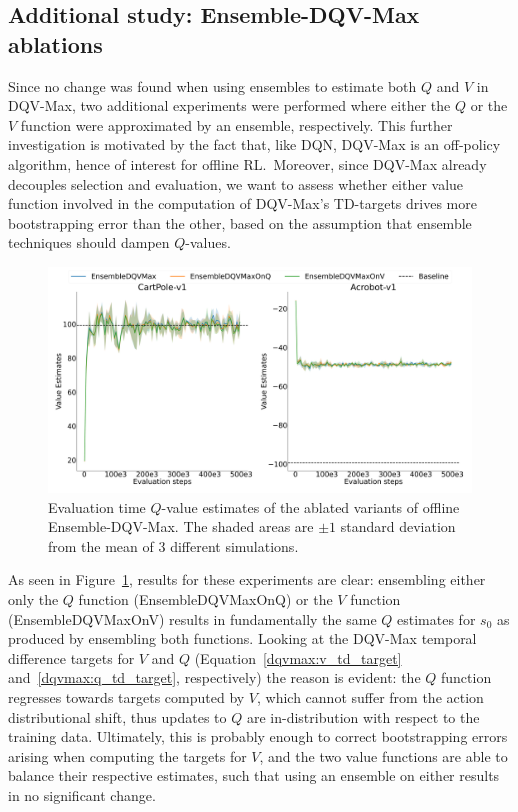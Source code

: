 \subsection{Additional study: Ensemble-DQV-Max ablations}
Since no change was found when using ensembles to estimate both $Q$
and $V$ in DQV-Max, two additional experiments were performed where
either the $Q$ or the $V$ function were approximated by an ensemble,
respectively. This further investigation is motivated by the fact
that, like DQN, DQV-Max is an off-policy algorithm, hence of interest
for offline RL.\ Moreover, since DQV-Max already decouples selection
and evaluation, we want to assess whether either value function
involved in the computation of DQV-Max's TD-targets drives more
bootstrapping error than the other, based on the assumption that
ensemble techniques should dampen $Q$-values.
\begin{figure}[!tbp]
  \centering
  \includegraphics[width=.5\textwidth]{img/dshift_plots_ablation_qv.png}
  \caption{Evaluation time $Q$-value estimates of the ablated variants
    of offline Ensemble-DQV-Max. The shaded areas are $\pm 1$ standard
    deviation from the mean of 3 different
    simulations.}\label{fig:dshift_dqvmax_ablations}
\end{figure}
As seen in Figure~\ref{fig:dshift_dqvmax_ablations}, results for these
experiments are clear: ensembling either only the $Q$ function
(EnsembleDQVMaxOnQ) or the $V$ function (EnsembleDQVMaxOnV) results in
fundamentally the same $Q$ estimates for $s_0$ as produced by
ensembling both functions. Looking at the DQV-Max temporal difference
targets for $V$ and $Q$ (Equation~\ref{dqvmax:v_td_target}
and~\ref{dqvmax:q_td_target}, respectively) the reason is evident: the
$Q$ function regresses towards targets computed by $V$, which cannot
suffer from the action distributional shift, thus updates to $Q$ are
in-distribution with respect to the training data. Ultimately, this is
probably enough to correct bootstrapping errors arising when computing
the targets for $V$, and the two value functions are able to balance
their respective estimates, such that using an ensemble on either
results in no significant change.

